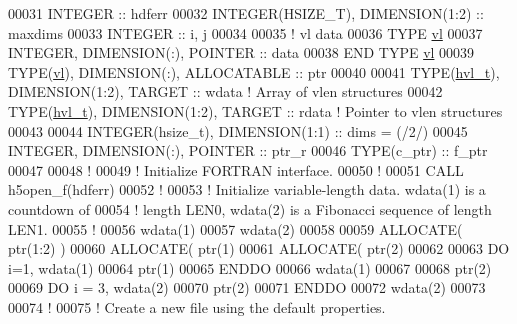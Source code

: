 \begin{DoxyCode}
00031   \textcolor{keywordtype}{INTEGER} :: hdferr
00032   \textcolor{keywordtype}{INTEGER(HSIZE\_T)}, \textcolor{keywordtype}{DIMENSION(1:2)}   :: maxdims
00033   \textcolor{keywordtype}{INTEGER} :: i, j
00034 
00035   \textcolor{comment}{! vl data}
00036   \textcolor{keyword}{TYPE} \hyperlink{structvl}{vl}
00037      \textcolor{keywordtype}{INTEGER}, \textcolor{keywordtype}{DIMENSION(:)}, \textcolor{keywordtype}{POINTER} :: data
00038 \textcolor{keyword}{  END TYPE }\hyperlink{structvl}{vl}
00039   \textcolor{keywordtype}{TYPE}(\hyperlink{structvl}{vl}), \textcolor{keywordtype}{DIMENSION(:)}, \textcolor{keywordtype}{ALLOCATABLE} :: ptr
00040 
00041   \textcolor{keywordtype}{TYPE}(\hyperlink{structhvl__t}{hvl\_t}), \textcolor{keywordtype}{DIMENSION(1:2)}, \textcolor{keywordtype}{TARGET} :: wdata \textcolor{comment}{! Array of vlen structures}
00042   \textcolor{keywordtype}{TYPE}(\hyperlink{structhvl__t}{hvl\_t}), \textcolor{keywordtype}{DIMENSION(1:2)}, \textcolor{keywordtype}{TARGET} :: rdata \textcolor{comment}{! Pointer to vlen structures}
00043 
00044   \textcolor{keywordtype}{INTEGER(hsize\_t)}, \textcolor{keywordtype}{DIMENSION(1:1)} :: dims = (/2/)
00045   \textcolor{keywordtype}{INTEGER}, \textcolor{keywordtype}{DIMENSION(:)}, \textcolor{keywordtype}{POINTER} :: ptr\_r 
00046   \textcolor{keywordtype}{TYPE}(c\_ptr) :: f\_ptr
00047   
00048   \textcolor{comment}{!}
00049   \textcolor{comment}{! Initialize FORTRAN interface.}
00050   \textcolor{comment}{!}
00051   \textcolor{keyword}{CALL }h5open\_f(hdferr)
00052   \textcolor{comment}{!}
00053   \textcolor{comment}{! Initialize variable-length data.  wdata(1) is a countdown of}
00054   \textcolor{comment}{! length LEN0, wdata(2) is a Fibonacci sequence of length LEN1.}
00055   \textcolor{comment}{!}
00056   wdata(1)%
00057   wdata(2)%
00058 
00059   \textcolor{keyword}{ALLOCATE}( ptr(1:2) )
00060   \textcolor{keyword}{ALLOCATE}( ptr(1)%
00061   \textcolor{keyword}{ALLOCATE}( ptr(2)%
00062 
00063   \textcolor{keywordflow}{DO} i=1, wdata(1)%
00064      ptr(1)%
00065 \textcolor{keywordflow}{  ENDDO}
00066   wdata(1)%
00067 
00068   ptr(2)%
00069   \textcolor{keywordflow}{DO} i = 3, wdata(2)%
00070      ptr(2)%
00071 \textcolor{keywordflow}{  ENDDO}
00072   wdata(2)%
00073 
00074   \textcolor{comment}{!}
00075   \textcolor{comment}{! Create a new file using the default properties.}

\end{DoxyCode}
